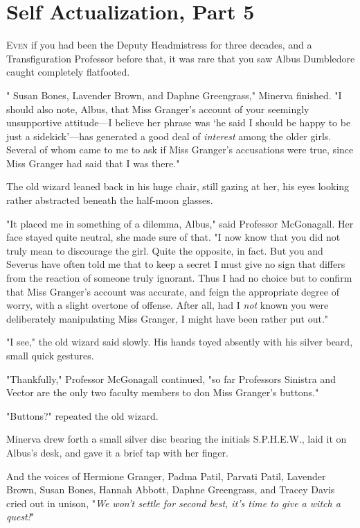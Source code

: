 \chapter{Self Actualization, Part 5}

\lettrine{E}{ven} if you had
been the Deputy Headmistress for three decades, and a Transfiguration Professor
before that, it was rare that you saw Albus Dumbledore caught completely
flatfooted.

"{\el} Susan Bones, Lavender Brown, and Daphne Greengrass," Minerva finished.
"I should also note, Albus, that Miss Granger's account of your seemingly
unsupportive attitude---I believe her phrase was `he said I should be happy to
be just a sidekick'---has generated a good deal of \emph{interest} among the
older girls. Several of whom came to me to ask if Miss Granger's accusations
were true, since Miss Granger had said that I was there."

The old wizard leaned back in his huge chair, still gazing at her, his eyes
looking rather abstracted beneath the half-moon glasses.

"It placed me in something of a dilemma, Albus," said Professor McGonagall. Her
face stayed quite neutral, she made sure of that. "I now know that you did not
truly mean to discourage the girl. Quite the opposite, in fact. But you and
Severus have often told me that to keep a secret I must give no sign that
differs from the reaction of someone truly ignorant. Thus I had no choice but
to confirm that Miss Granger's account was accurate, and feign the appropriate
degree of worry, with a slight overtone of offense. After all, had I \emph{not}
known you were deliberately manipulating Miss Granger, I might have been rather
put out."

"I{\el} see," the old wizard said slowly. His hands toyed absently with his
silver beard, small quick gestures.

"Thankfully," Professor McGonagall continued, "so far Professors Sinistra and
Vector are the only two faculty members to don Miss Granger's buttons."

"Buttons?" repeated the old wizard.

Minerva drew forth a small silver disc bearing the initials S.P.H.E.W., laid it
on Albus's desk, and gave it a brief tap with her finger.

And the voices of Hermione Granger, Padma Patil, Parvati Patil, Lavender Brown,
Susan Bones, Hannah Abbott, Daphne Greengrass, and Tracey Davis cried out in
unison, "\emph{We won't settle for second best, it's time to give a witch a
quest!}"


